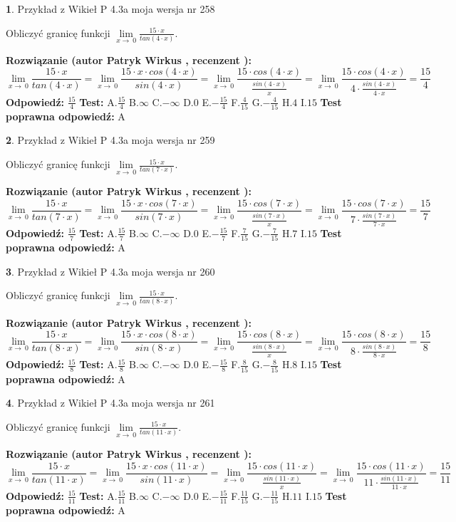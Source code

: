 \documentclass[12pt, a4paper]{article}
\theoremstyle{definition} %
\newtheorem{zad}{}
\newcommand{\zadStart}[1]{\begin{zad}#1\newline}
\newcommand{\zadStop}{\end{zad}}
\newcommand{\rozwStart}[2]{\noindent \textbf{Rozwiązanie (autor #1 , recenzent #2): }\newline}
\newcommand{\rozwStop}{\newline}
\newcommand{\odpStart}{\noindent \textbf{Odpowiedź:}\newline}
\newcommand{\odpStop}{\newline}
\newcommand{\testStart}{\noindent \textbf{Test:}\newline}
\newcommand{\testStop}{\newline}
\newcommand{\kluczStart}{\noindent \textbf{Test poprawna odpowiedź:}\newline}
\newcommand{\kluczStop}{\newline}
\begin{document}
\zadStart{Przykład z Wikieł P 4.3a moja wersja nr 258}


Obliczyć granicę funkcji $\lim\limits_{x\to\ 0}\frac{15 \cdot x}{tan(4 \cdot x)}$.
\zadStop
\rozwStart{Patryk Wirkus}{}
$$\lim\limits_{x\to\ 0}\frac{15 \cdot x}{tan(4 \cdot x)}=\lim\limits_{x\to\ 0}\frac{15 \cdot x \cdot cos(4 \cdot x)}{sin(4 \cdot x)}=\lim\limits_{x\to\ 0}\frac{15 \cdot cos(4 \cdot x)}{\frac{sin(4 \cdot x)}{x}}=\lim\limits_{x\to\ 0}\frac{15 \cdot cos(4 \cdot x)}{4 \cdot \frac{sin(4 \cdot x)}{4 \cdot x}} = \frac{15}{4}$$
\rozwStop
\odpStart
$\frac{15}{4}$
\odpStop
\testStart
A.$\frac{15}{4}$
B.$\infty$
C.$-\infty$
D.$0$
E.$-\frac{15}{4}$
F.$\frac{4}{15}$
G.$-\frac{4}{15}$
H.$4$
I.$15$
\testStop
\kluczStart
A
\kluczStop



\zadStart{Przykład z Wikieł P 4.3a moja wersja nr 259}


Obliczyć granicę funkcji $\lim\limits_{x\to\ 0}\frac{15 \cdot x}{tan(7 \cdot x)}$.
\zadStop
\rozwStart{Patryk Wirkus}{}
$$\lim\limits_{x\to\ 0}\frac{15 \cdot x}{tan(7 \cdot x)}=\lim\limits_{x\to\ 0}\frac{15 \cdot x \cdot cos(7 \cdot x)}{sin(7 \cdot x)}=\lim\limits_{x\to\ 0}\frac{15 \cdot cos(7 \cdot x)}{\frac{sin(7 \cdot x)}{x}}=\lim\limits_{x\to\ 0}\frac{15 \cdot cos(7 \cdot x)}{7 \cdot \frac{sin(7 \cdot x)}{7 \cdot x}} = \frac{15}{7}$$
\rozwStop
\odpStart
$\frac{15}{7}$
\odpStop
\testStart
A.$\frac{15}{7}$
B.$\infty$
C.$-\infty$
D.$0$
E.$-\frac{15}{7}$
F.$\frac{7}{15}$
G.$-\frac{7}{15}$
H.$7$
I.$15$
\testStop
\kluczStart
A
\kluczStop



\zadStart{Przykład z Wikieł P 4.3a moja wersja nr 260}


Obliczyć granicę funkcji $\lim\limits_{x\to\ 0}\frac{15 \cdot x}{tan(8 \cdot x)}$.
\zadStop
\rozwStart{Patryk Wirkus}{}
$$\lim\limits_{x\to\ 0}\frac{15 \cdot x}{tan(8 \cdot x)}=\lim\limits_{x\to\ 0}\frac{15 \cdot x \cdot cos(8 \cdot x)}{sin(8 \cdot x)}=\lim\limits_{x\to\ 0}\frac{15 \cdot cos(8 \cdot x)}{\frac{sin(8 \cdot x)}{x}}=\lim\limits_{x\to\ 0}\frac{15 \cdot cos(8 \cdot x)}{8 \cdot \frac{sin(8 \cdot x)}{8 \cdot x}} = \frac{15}{8}$$
\rozwStop
\odpStart
$\frac{15}{8}$
\odpStop
\testStart
A.$\frac{15}{8}$
B.$\infty$
C.$-\infty$
D.$0$
E.$-\frac{15}{8}$
F.$\frac{8}{15}$
G.$-\frac{8}{15}$
H.$8$
I.$15$
\testStop
\kluczStart
A
\kluczStop



\zadStart{Przykład z Wikieł P 4.3a moja wersja nr 261}


Obliczyć granicę funkcji $\lim\limits_{x\to\ 0}\frac{15 \cdot x}{tan(11 \cdot x)}$.
\zadStop
\rozwStart{Patryk Wirkus}{}
$$\lim\limits_{x\to\ 0}\frac{15 \cdot x}{tan(11 \cdot x)}=\lim\limits_{x\to\ 0}\frac{15 \cdot x \cdot cos(11 \cdot x)}{sin(11 \cdot x)}=\lim\limits_{x\to\ 0}\frac{15 \cdot cos(11 \cdot x)}{\frac{sin(11 \cdot x)}{x}}=\lim\limits_{x\to\ 0}\frac{15 \cdot cos(11 \cdot x)}{11 \cdot \frac{sin(11 \cdot x)}{11 \cdot x}} = \frac{15}{11}$$
\rozwStop
\odpStart
$\frac{15}{11}$
\odpStop
\testStart
A.$\frac{15}{11}$
B.$\infty$
C.$-\infty$
D.$0$
E.$-\frac{15}{11}$
F.$\frac{11}{15}$
G.$-\frac{11}{15}$
H.$11$
I.$15$
\testStop
\kluczStart
A
\kluczStop
\end{document}
